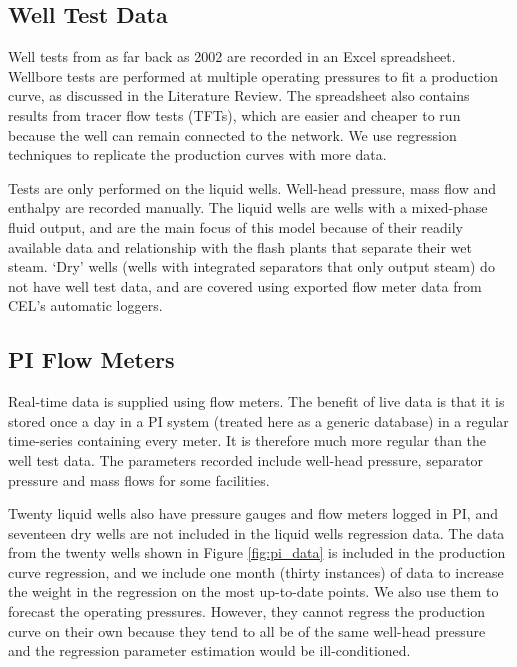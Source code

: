 \documentclass[a4paper, 12pt]{article}
\begin{document}
\subsection{Well Test Data}
Well tests from as far back as 2002 are recorded in an Excel spreadsheet. Wellbore tests are performed at multiple operating pressures to fit a production curve, as discussed in the Literature Review. The spreadsheet also contains results from tracer flow tests (TFTs), which are easier and cheaper to run because the well can remain connected to the network. We use regression techniques to replicate the production curves with more data.

Tests are only performed on the liquid wells. Well-head pressure, mass flow and enthalpy are recorded manually. The liquid wells are wells with a mixed-phase fluid output, and are the main focus of this model because of their readily available data and relationship with the flash plants that separate their wet steam. 
`Dry' wells (wells with integrated separators that only output steam) do not have well test data, and are covered using exported flow meter data from CEL's automatic loggers.

\subsection{PI Flow Meters}
Real-time data is supplied using flow meters. The benefit of live data is that it is stored once a day in a PI system (treated here as a generic database) in a regular time-series containing every meter. It is therefore much more regular than the well test data. The parameters recorded include well-head pressure, separator pressure and mass flows for some facilities.


Twenty liquid wells also have pressure gauges and flow meters logged in PI, and seventeen dry wells are not included in the liquid wells regression data. The data from the twenty wells shown in Figure \ref{fig:pi_data} is included in the production curve regression, and we include one month (thirty instances) of data to increase the weight in the regression on the most up-to-date points. We also use them to forecast the operating pressures. However, they cannot regress the production curve on their own because they tend to all be of the same well-head pressure and the regression parameter estimation would be ill-conditioned.
\end{document}
